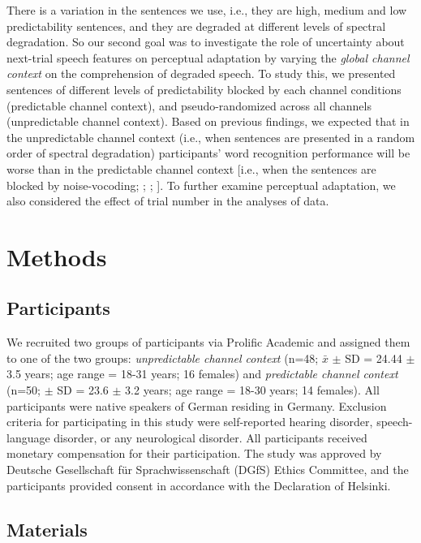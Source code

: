 \documentclass[a4paper, nobind]{templates/ociamthesis}
\begin{document}
There is a variation in the sentences we use, i.e., they are high, medium and low predictability sentences, and they are degraded at different levels of spectral degradation.
So our second goal was to investigate the role of uncertainty about next-trial speech features on perceptual adaptation by varying the \emph{global channel context} on the comprehension of degraded speech.
To study this, we presented sentences of different levels of predictability blocked by each channel conditions (predictable channel context), and pseudo-randomized across all channels (unpredictable channel context).
Based on previous findings, we expected that in the unpredictable channel context (i.e., when sentences are presented in a random order of spectral degradation) participants' word recognition performance will be worse than in the predictable channel context {[}i.e., when the sentences are blocked by noise-vocoding; \textcite{Sommers1994}; \textcite{Garrido2011}; \textcite{Vaden2013}{]}.
To further examine perceptual adaptation, we also considered the effect of trial number in the analyses of data.

\hypertarget{methods-2}{%
\section{Methods}\label{methods-2}}

\hypertarget{participants-1}{%
\subsection{Participants}\label{participants-1}}

We recruited two groups of participants via Prolific Academic and assigned them to one of the two groups:
\emph{unpredictable channel context} (n=48; \(\bar{x}\) \(\pm\) SD = 24.44 \(\pm\) 3.5 years; age range = 18-31 years; 16 females) and \emph{predictable channel context} (n=50; \(\pm\) SD = 23.6 \(\pm\) 3.2 years; age range = 18-30 years; 14 females).
All participants were native speakers of German residing in Germany.
Exclusion criteria for participating in this study were self-reported hearing disorder, speech-language disorder, or any neurological disorder.
All participants received monetary compensation for their participation.
The study was approved by Deutsche Gesellschaft für Sprachwissenschaft (DGfS) Ethics Committee, and the participants provided consent in accordance with the Declaration of Helsinki.

\hypertarget{materials-1}{%
\subsection{Materials}\label{materials-1}}
\end{document}
